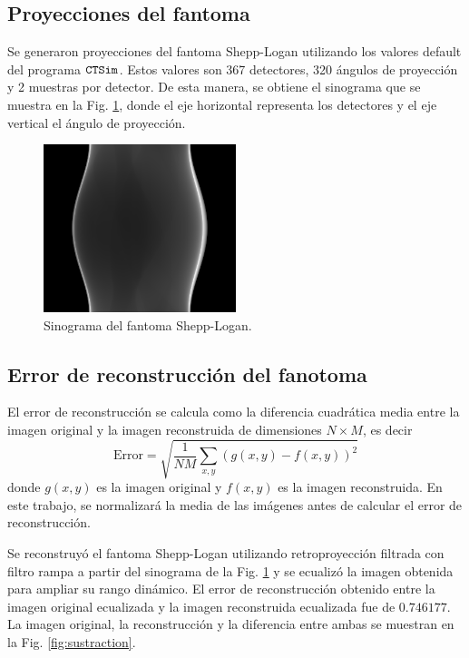 \documentclass[letterpaper,12pt]{article}
\theoremstyle{plain}
\begin{document}
\subsection{Proyecciones del fantoma}

Se generaron proyecciones del fantoma Shepp-Logan utilizando los valores default del programa $\verb|CTSim|$. Estos valores son 367 detectores, 320 ángulos de proyección y 2 muestras por detector. De esta manera, se obtiene el sinograma que se muestra en la Fig. \ref{fig:SL_sinogram}, donde el eje horizontal representa los detectores y el eje vertical el ángulo de proyección.

\begin{figure}[H]
   \centering
         \includegraphics[width=0.5\textwidth]{Figuras/SL_sinogram.png}
   \caption{Sinograma del fantoma Shepp-Logan.}
   \label{fig:SL_sinogram}
\end{figure}

\subsection{Error de reconstrucción del fanotoma}

El error de reconstrucción se calcula como la diferencia cuadrática media entre la imagen original y la imagen reconstruida de dimensiones $N\times M$, es decir
\begin{equation}
      \text{Error} = \sqrt{\frac{1}{NM}\sum_{x,y}(g(x,y) - f(x,y))^2}
\end{equation}
donde $g(x,y)$ es la imagen original y $f(x,y)$ es la imagen reconstruida. En este trabajo, se normalizará la media de las imágenes antes de calcular el error de reconstrucción.

Se reconstruyó el fantoma Shepp-Logan utilizando retroproyección filtrada con filtro rampa a partir del sinograma de la Fig. \ref{fig:SL_sinogram} y se ecualizó la imagen obtenida para ampliar su rango dinámico. El error de reconstrucción obtenido entre la imagen original ecualizada y la imagen reconstruida ecualizada fue de $0.746177$. La imagen original, la reconstrucción y la diferencia entre ambas se muestran en la Fig. \ref{fig:sustraction}.
\end{document}
